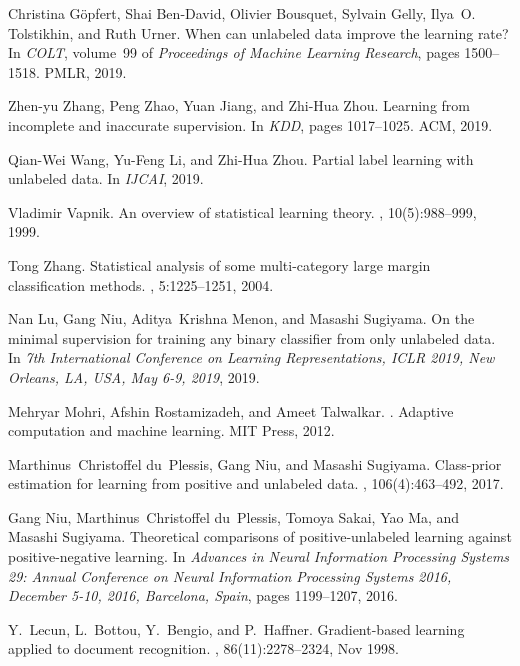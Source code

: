 \documentclass[]{article} \usepackage{geometry}
\begin{document}
\begin{thebibliography}{10}
Christina G{\"{o}}pfert, Shai Ben{-}David, Olivier Bousquet, Sylvain Gelly,
  Ilya~O. Tolstikhin, and Ruth Urner.
\newblock When can unlabeled data improve the learning rate?
\newblock In {\em {COLT}}, volume~99 of {\em Proceedings of Machine Learning
  Research}, pages 1500--1518. {PMLR}, 2019.

Zhen{-}yu Zhang, Peng Zhao, Yuan Jiang, and Zhi{-}Hua Zhou.
\newblock Learning from incomplete and inaccurate supervision.
\newblock In {\em {KDD}}, pages 1017--1025. {ACM}, 2019.

Qian{-}Wei Wang, Yu{-}Feng Li, and Zhi{-}Hua Zhou.
\newblock Partial label learning with unlabeled data.
\newblock In {\em {IJCAI}}, 2019.

Vladimir Vapnik.
\newblock An overview of statistical learning theory.
, 10(5):988--999, 1999.

Tong Zhang.
\newblock Statistical analysis of some multi-category large margin
  classification methods.
, 5:1225--1251, 2004.

Nan Lu, Gang Niu, Aditya~Krishna Menon, and Masashi Sugiyama.
\newblock On the minimal supervision for training any binary classifier from
  only unlabeled data.
\newblock In {\em 7th International Conference on Learning Representations,
  {ICLR} 2019, New Orleans, LA, USA, May 6-9, 2019}, 2019.

Mehryar Mohri, Afshin Rostamizadeh, and Ameet Talwalkar.
.
\newblock Adaptive computation and machine learning. {MIT} Press, 2012.

Marthinus~Christoffel du~Plessis, Gang Niu, and Masashi Sugiyama.
\newblock Class-prior estimation for learning from positive and unlabeled data.
, 106(4):463--492, 2017.

Gang Niu, Marthinus~Christoffel du~Plessis, Tomoya Sakai, Yao Ma, and Masashi
  Sugiyama.
\newblock Theoretical comparisons of positive-unlabeled learning against
  positive-negative learning.
\newblock In {\em Advances in Neural Information Processing Systems 29: Annual
  Conference on Neural Information Processing Systems 2016, December 5-10,
  2016, Barcelona, Spain}, pages 1199--1207, 2016.

Y.~{Lecun}, L.~{Bottou}, Y.~{Bengio}, and P.~{Haffner}.
\newblock Gradient-based learning applied to document recognition.
, 86(11):2278--2324, Nov 1998.


\end{thebibliography}
\end{document}
